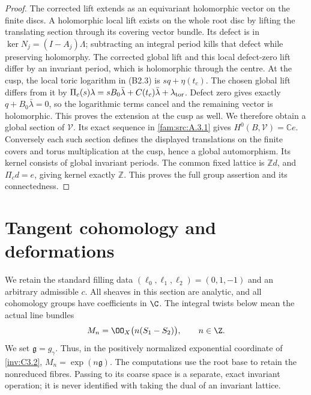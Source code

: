 \begin{proof}
The corrected lift extends as an equivariant holomorphic vector on the finite discs. A holomorphic local lift exists on the whole root disc by lifting the translating section through its covering vector bundle. Its defect is in $\ker N_j=(I-A_j)\Lambda$; subtracting an integral period kills that defect while preserving holomorphy. The corrected global lift and this local defect-zero lift differ by an invariant period, which is holomorphic through the centre. At the cusp, the local toric logarithm in (B2.3) is $sq+\eta(t_c)$. The chosen global lift differs from it by $\Pi_c(s)\lambda=sB_0\bar\lambda+C(t_c)\bar\lambda+\lambda_{\rm tor}$. Defect zero gives exactly $q+B_0\bar\lambda=0$, so the logarithmic terms cancel and the remaining vector is holomorphic. This proves the extension at the cusp as well. We therefore obtain a global section of $\mathcal V$. Its exact sequence in \ref{fam:src:A.3.1} gives $H^0(B,\mathcal V)=\mathbb Ce$. Conversely each such section defines the displayed translations on the finite covers and torus multiplication at the cusp, hence a global automorphism. Its kernel consists of global invariant periods. The common fixed lattice is $\mathbb Zd$, and $\Pi_cd=e$, giving kernel exactly $\mathbb Z$. This proves the full group assertion and its connectedness.
\end{proof}


\section{Tangent cohomology and deformations}

We retain the standard filling data $(\ell _0,\ell _1,\ell _2)=(0,1,-1)$
and an arbitrary admissible $c$. All sheaves in this section are analytic,
and all cohomology groups have coefficients in $\C$. The integral twists
below mean the actual line bundles
\[
 M_n=\OO_X\bigl(n(S_1-S_2)\bigr),\qquad n\in\Z.
\]
We set $\mathfrak g=g_\gamma$. Thus, in the positively normalized
exponential coordinate of \ref{inv:C3.2},
$M_n=\exp(n\mathfrak g)$. The computations use the root base to retain the
nonreduced fibres. Passing to its coarse space is a separate, exact
invariant operation; it is never identified with taking the dual of an
invariant lattice.

